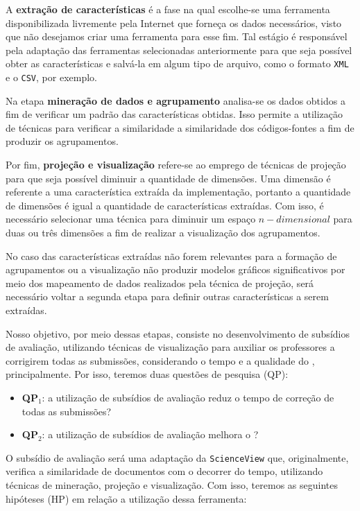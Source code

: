	A \textbf{extração de características} é a fase na qual escolhe-se uma ferramenta
	disponibilizada livremente pela Internet que forneça os dados necessários, visto
	que não desejamos criar uma ferramenta para esse fim. Tal estágio é responsável pela
	adaptação das ferramentas selecionadas anteriormente para que seja possível obter
	as características e salvá-la em algum tipo de arquivo, como o formato \texttt{XML}
	e o \texttt{CSV}, por exemplo.

	Na etapa \textbf{mineração de dados e agrupamento} analisa-se os dados obtidos a
	fim de verificar um padrão das características obtidas. Isso permite a utilização
	de técnicas para verificar a similaridade a similaridade dos códigos-fontes a fim
	de produzir os agrupamentos.
	
	Por fim, \textbf{projeção e visualização} refere-se ao emprego de técnicas de
	projeção para que seja possível diminuir a quantidade de dimensões. Uma dimensão
	é referente a uma característica extraída da implementação, portanto a quantidade
	de dimensões é igual a quantidade de características extraídas. Com isso, é
	necessário selecionar uma técnica para diminuir um espaço $n-dimensional$ para
	duas ou três dimensões a fim de realizar a visualização dos agrupamentos.
	
	No caso das características extraídas não forem relevantes para a formação de
	agrupamentos ou a visualização não produzir modelos gráficos significativos por
	meio dos mapeamento de dados realizados pela técnica de projeção, será necessário
	voltar a segunda etapa para definir outras características a serem extraídas.
	
	Nosso objetivo, por meio dessas etapas, consiste no desenvolvimento de subsídios
	de avaliação, utilizando técnicas de visualização para auxiliar os professores a
	corrigirem todas as submissões, considerando o tempo e a qualidade do ,
	principalmente. Por isso, teremos duas questões de pesquisa (QP):
	
	\begin{itemize}
		\item \textbf{QP$_1$}: a utilização de subsídios de avaliação reduz o tempo
		de correção de todas as submissões?
		\item \textbf{QP$_2$}: a utilização de subsídios de avaliação melhora o ?
	\end{itemize}
	
	O subsídio de avaliação será uma adaptação da \texttt{ScienceView} \cite{Alencar-etal:2012}
	que, originalmente, verifica a similaridade de documentos com o decorrer do tempo,
	utilizando técnicas de mineração, projeção e visualização. Com isso, teremos as
	seguintes hipóteses (HP) em relação a utilização dessa ferramenta:
	
